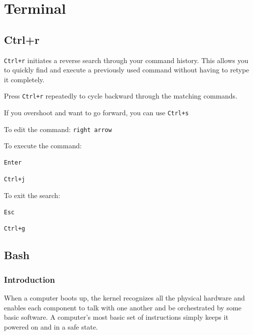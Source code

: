 \documentclass{article}
\newenvironment{codetemplate}[1][]{%
  \mybasecolorbox[#1]
  \itshape
}{%
  \endmybasecolorbox
}
\begin{document}
\newpage
\section{Terminal}

\subsection{Ctrl+r}

\verb|Ctrl+r| initiates a reverse search through your command history. This allows you to quickly find and execute a previously used command without having to retype it completely.

Press \verb|Ctrl+r| repeatedly to cycle backward through the matching commands.

If you overshoot and want to go forward, you can use \verb|Ctrl+s|

To edit the command: \verb|right arrow|

To execute the command:
\begin{codetemplate}
\begin{verbatim}
Enter
\end{verbatim}
\end{codetemplate}
\begin{codetemplate}
\begin{verbatim}
Ctrl+j
\end{verbatim}
\end{codetemplate}

To exit the search:
\begin{codetemplate}
\begin{verbatim}
Esc
\end{verbatim}
\end{codetemplate}
\begin{codetemplate}
\begin{verbatim}
Ctrl+g
\end{verbatim}
\end{codetemplate}

\subsection{Bash}

\subsubsection{Introduction}
When a computer boots up, the kernel recognizes all the physical hardware and enables each component to talk with one another and be orchestrated by some basic software. A computer's most basic set of instructions simply keeps it powered on and in a safe state.
\end{document}
